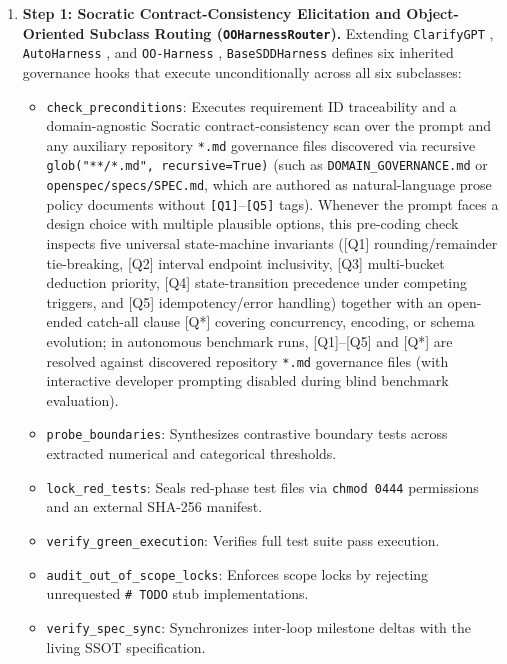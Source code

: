 \documentclass[11pt,a4paper,copyright]{google}
\begin{document}
\begin{enumerate}[leftmargin=1.5em,itemsep=3pt,topsep=3pt]
  \item \textbf{Step 1: Socratic Contract-Consistency Elicitation and Object-Oriented Subclass Routing (\texttt{OOHarnessRouter}).} Extending \texttt{ClarifyGPT} \cite{mu2024clarifygpt}, \texttt{AutoHarness} \cite{lou2026autoharness}, and \texttt{OO-Harness} \cite{li2026ooharness}, \texttt{BaseSDDHarness} defines six inherited governance hooks that execute unconditionally across all six subclasses:
  \begin{itemize}[leftmargin=1.5em,itemsep=1pt,topsep=1pt]
    \item \texttt{check\_preconditions}: Executes requirement ID traceability and a domain-agnostic Socratic contract-consistency scan over the prompt and any auxiliary repository \texttt{*.md} governance files discovered via recursive \texttt{glob("**/*.md", recursive=True)} (such as \texttt{DOMAIN\_GOVERNANCE.md} or \texttt{openspec/specs/SPEC.md}, which are authored as natural-language prose policy documents without \texttt{[Q1]}--\texttt{[Q5]} tags). Whenever the prompt faces a design choice with multiple plausible options, this pre-coding check inspects five universal state-machine invariants ([Q1] rounding/remainder tie-breaking, [Q2] interval endpoint inclusivity, [Q3] multi-bucket deduction priority, [Q4] state-transition precedence under competing triggers, and [Q5] idempotency/error handling) together with an open-ended catch-all clause [Q*] covering concurrency, encoding, or schema evolution; in autonomous benchmark runs, [Q1]--[Q5] and [Q*] are resolved against discovered repository \texttt{*.md} governance files (with interactive developer prompting \cite{mu2024clarifygpt} disabled during blind benchmark evaluation).
    \item \texttt{probe\_boundaries}: Synthesizes contrastive boundary tests across extracted numerical and categorical thresholds.
    \item \texttt{lock\_red\_tests}: Seals red-phase test files via \texttt{chmod 0444} permissions and an external SHA-256 manifest.
    \item \texttt{verify\_green\_execution}: Verifies full test suite pass execution.
    \item \texttt{audit\_out\_of\_scope\_locks}: Enforces scope locks by rejecting unrequested \texttt{\# TODO} stub implementations.
    \item \texttt{verify\_spec\_sync}: Synchronizes inter-loop milestone deltas with the living SSOT specification.

\end{itemize}
\end{enumerate}
\end{document}
